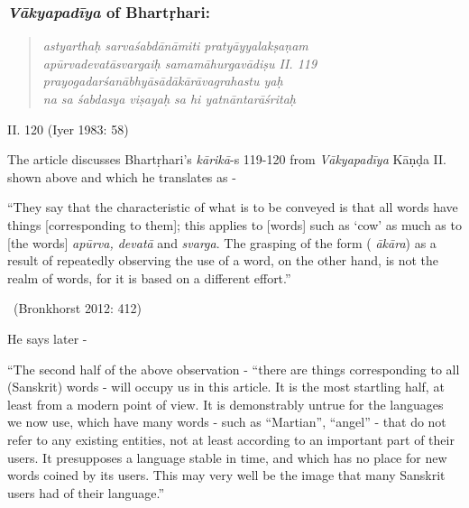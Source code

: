\vspace{-0.25cm}

\subsubsection*{\textit{Vākyapadīya} of Bhartṛhari:}

\begin{verse}
\textit{astyarthaḥ sarvaśabdānāmiti pratyāyyalakṣaṇam }\\
\textit{apūrvadevatāsvargaiḥ samamāhurgavādiṣu  II. 119\\
\textit{prayogadarśanābhyāsādākārāvagrahastu yaḥ }\\
\textit{na sa śabdasya viṣayaḥ sa hi yatnāntarāśritaḥ }}
\end{verse}

\vspace{-0.55cm}

\begin{flushright}
II. 120 (Iyer 1983: 58)
\end{flushright}


The article discusses Bhartṛhari’s \textit{kārikā}-s 119-120 from \textit{Vākyapadīya} Kāṇḍa II. shown above and which he translates as -

\begin{myquote}
“They say that the characteristic of what is to be conveyed is that all words have things [corresponding to them]; this applies to [words] such as ‘cow’ as much as to [the words] \textit{apūrva, devatā} and \textit{svarga}. The grasping of the form (\textit{ ākāra}) as a result of repeatedly observing the use of a word, on the other hand, is not the realm of words, for it is based on a different effort.” 
\end{myquote}

\vspace{-.3cm}

\begin{myquote}

~\hfill (Bronkhorst 2012: 412)
\end{myquote}

He says later -

\begin{myquote}
“The second half of the above observation - “there are things corresponding to all (Sanskrit) words - will occupy us in this article. It is the most startling half, at least from a modern point of view. It is demonstrably untrue for the languages we now use, which have many words - such as “Martian”, “angel” - that do not refer to any existing entities, not at least according to an important part of their users. It presupposes a language stable in time, and which has no place for new words coined by its users. This may very well be the image that many Sanskrit users had of their language.”
\end{myquote}

